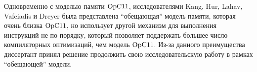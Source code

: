 Одновременно с моделью памяти $\mathrm{OpC11}$, исследователями Kang, Hur, Lahav, Vafeiadis и Dreyer была представлена ``обещающая'' модель
памяти, которая очень близка $\mathrm{OpC11}$, но использует другой механизм для выполнения инструкций не по порядку, который позволяет
поддержать большее число компиляторных оптимизаций, чем модель $\mathrm{OpC11}$.
Из-за данного преимущества диссертант принял решение продолжить свою исследовательскую работу в рамках ``обещающей'' модели.





